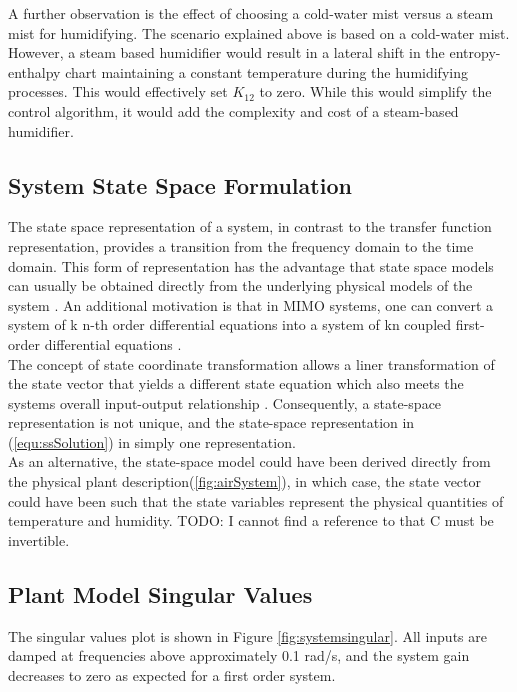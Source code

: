 \documentclass[a4paper, titlepage]{article}
\begin{document}
A further observation is the effect of choosing a cold-water mist versus a steam mist for humidifying.  The scenario explained above is based on a cold-water mist.  However, a steam based humidifier would result in a lateral shift in the entropy-enthalpy chart maintaining a constant temperature during the humidifying processes.  This would effectively set $K_{12}$ to zero.  While this would simplify the control algorithm, it would add the complexity and cost of a steam-based humidifier.\\   

\subsection{System State Space Formulation}
   
The state space representation of a system, in contrast to the transfer function representation, provides a transition from the frequency domain to the time domain.  This form of representation has the advantage that state space models can usually be obtained directly from the underlying physical models of the system \citep[p.~32]{glad00}.  An additional motivation is that in MIMO systems, one can convert a system of k n-th order differential equations into a system of kn coupled first-order differential equations \citep[p.~5]{williams07}.\\

The concept of state coordinate transformation allows a liner transformation of the state vector that yields a different state equation which also meets the systems overall input-output relationship \citep[p.~72]{williams07}.  Consequently, a state-space representation is not unique, and the state-space representation in (\ref{equ:ssSolution}) in simply one representation.\\

As an alternative, the state-space model could have been derived directly from the physical plant description(\ref{fig:airSystem}), in which case, the state vector could have been such that the state variables represent the physical quantities of temperature and humidity. 
TODO: I cannot find a reference to that C must be invertible.\\

\subsection{Plant Model Singular Values}

The singular values plot is shown in Figure \ref{fig:systemsingular}.  All inputs are damped at frequencies above approximately 0.1 rad/s, and the system gain decreases to zero as expected for a first order system.
\end{document}

